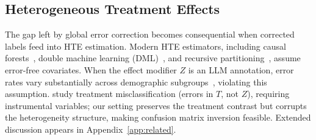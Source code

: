 \subsection{Heterogeneous Treatment Effects}

The gap left by global error correction becomes consequential when corrected labels feed into HTE estimation.
Modern HTE estimators, including causal forests~\cite{wager2018causal}, double machine learning (DML)~\cite{chernozhukov2018dml}, and recursive partitioning~\cite{athey2016recursive}, assume error-free covariates.
When the effect modifier $Z$ is an LLM annotation, error rates vary substantially across demographic subgroups~\cite{ashwin2025bias}, violating this assumption.
\citet{imai2010causal} study treatment misclassification (errors in $T$, not $Z$), requiring instrumental variables; our setting preserves the treatment contrast but corrupts the heterogeneity structure, making confusion matrix inversion feasible.
Extended discussion appears in Appendix~\ref{app:related}.
